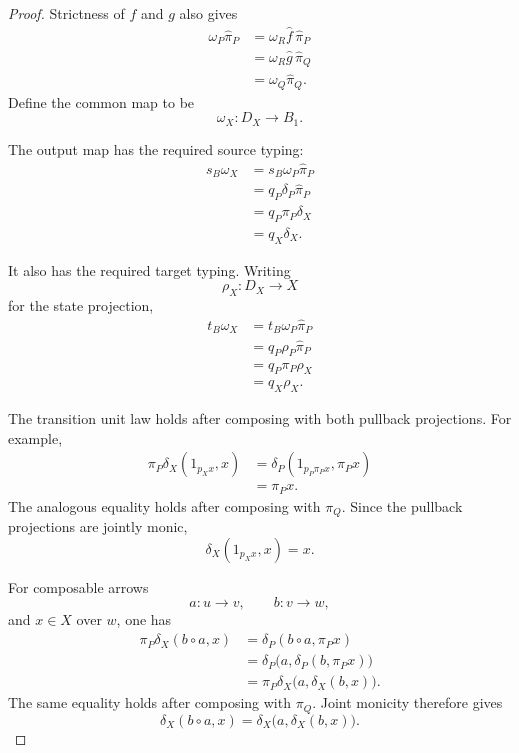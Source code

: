 \begin{proof}
    Strictness of \(f\) and \(g\) also gives
    \[
    \begin{aligned}
        \omega_P\widehat\pi_P
        &=
        \omega_R\widehat f\,\widehat\pi_P
        \\
        &=
        \omega_R\widehat g\,\widehat\pi_Q
        \\
        &=
        \omega_Q\widehat\pi_Q.
    \end{aligned}
    \]
    Define the common map to be
    \[
        \omega_X:D_X\to B_1.
    \]

    The output map has the required source typing:
    \[
    \begin{aligned}
        s_B\omega_X
        &=
        s_B\omega_P\widehat\pi_P
        \\
        &=
        q_P\delta_P\widehat\pi_P
        \\
        &=
        q_P\pi_P\delta_X
        \\
        &=
        q_X\delta_X.
    \end{aligned}
    \]

    It also has the required target typing. Writing
    \[
        \rho_X:D_X\to X
    \]
    for the state projection,
    \[
    \begin{aligned}
        t_B\omega_X
        &=
        t_B\omega_P\widehat\pi_P
        \\
        &=
        q_P\rho_P\widehat\pi_P
        \\
        &=
        q_P\pi_P\rho_X
        \\
        &=
        q_X\rho_X.
    \end{aligned}
    \]

    The transition unit law holds after composing with both pullback
    projections. For example,
    \[
    \begin{aligned}
        \pi_P\delta_X(1_{p_Xx},x)
        &=
        \delta_P(1_{p_P\pi_Px},\pi_Px)
        \\
        &=
        \pi_Px.
    \end{aligned}
    \]
    The analogous equality holds after composing with \(\pi_Q\). Since the
    pullback projections are jointly monic,
    \[
        \delta_X(1_{p_Xx},x)=x.
    \]

    For composable arrows
    \[
        a:u\to v,
        \qquad
        b:v\to w,
    \]
    and \(x\in X\) over \(w\), one has
    \[
    \begin{aligned}
        \pi_P\delta_X(b\circ a,x)
        &=
        \delta_P(b\circ a,\pi_Px)
        \\
        &=
        \delta_P
        \bigl(
            a,
            \delta_P(b,\pi_Px)
        \bigr)
        \\
        &=
        \pi_P\delta_X
        \bigl(
            a,
            \delta_X(b,x)
        \bigr).
    \end{aligned}
    \]
    The same equality holds after composing with \(\pi_Q\). Joint monicity
    therefore gives
    \[
        \delta_X(b\circ a,x)
        =
        \delta_X
        \bigl(
            a,
            \delta_X(b,x)
        \bigr).
    \]


\end{proof}
